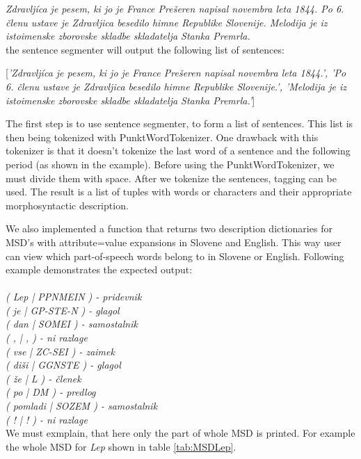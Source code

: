 \documentclass[10pt, conference, compsocconf]{IEEEtran}
\begin{document}
\begin{itemize}
\textit{Zdravljíca je pesem, ki jo je France Prešeren napisal novembra leta 1844. Po 6. členu ustave je Zdravljica besedilo himne Republike Slovenije. Melodija je iz istoimenske zborovske skladbe skladatelja Stanka Premrla.}\\

the sentence segmenter will output the following list of sentences:

[\textit{'Zdravljíca je pesem, ki jo je France Prešeren napisal novembra leta 1844.', 'Po 6. členu ustave je Zdravljica besedilo himne Republike Slovenije.', 'Melodija je iz istoimenske zborovske skladbe skladatelja Stanka Premrla.'}]
\end{itemize} 


The first step is to use sentence segmenter, to form a list of sentences. This list is then being tokenized with PunktWordTokenizer. One drawback with this tokenizer is that it doesn't tokenize the last word of a sentence and the following period (as shown in the example). Before using the PunktWordTokenizer, we must divide them with space. After we tokenize the sentences, tagging can be used. The result is a list of tuples with words or characters and their appropriate morphosyntactic description. 

We also implemented a function that returns two description dictionaries for MSD's with attribute=value expansions in Slovene and English. This way user can view which part-of-speech words belong to in Slovene or English. Following example demonstrates the expected output:
\\\\
\textit{( Lep  |  PPNMEIN ) - pridevnik \\
	( je  |  GP-STE-N ) - glagol\\
	( dan  |  SOMEI ) - samostalnik\\
	( ,  |  , ) - ni razlage\\
	( vse  |  ZC-SEI ) - zaimek\\
	( diši  |  GGNSTE ) - glagol\\
	( že  |  L ) - členek\\
	( po  |  DM ) - predlog\\
	( pomladi  |  SOZEM ) - samostalnik\\
	( !  |  ! ) - ni razlage}\\

We must exmplain, that here only the part of whole MSD is printed. For example the whole MSD for \textit{Lep} shown in table \ref{tab:MSDLep}.
\end{document}
